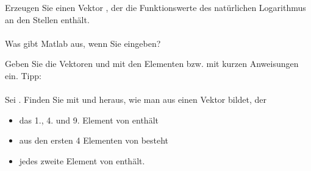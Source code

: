     \secMexercise
    \begin{frame}
      \frameMexercise
      \begin{exercise}
          \sloppy
          Erzeugen Sie einen Vektor , der die Funktionswerte des natürlichen Logarithmus an den Stellen
           enthält. \\ \\

          Was gibt Matlab aus, wenn Sie  eingeben?
      \end{exercise}
    \end{frame}

    \secMexercise
    \begin{frame}
      \frameMexercise
      \begin{exercise}
          \sloppy
          Geben Sie die Vektoren  und  mit den Elementen
           bzw.  mit kurzen Anweisungen ein.
          \alert{Tipp}:  \\ \\

          Sei . Finden Sie mit
           und  heraus, wie man aus  einen Vektor bildet, der

          \begin{itemize}
              \item das 1., 4. und 9. Element von  enthält
              \item aus den ersten 4 Elementen von  besteht
              \item jedes zweite Element von  enthält.
          \end{itemize}
      \end{exercise}
    \end{frame}

